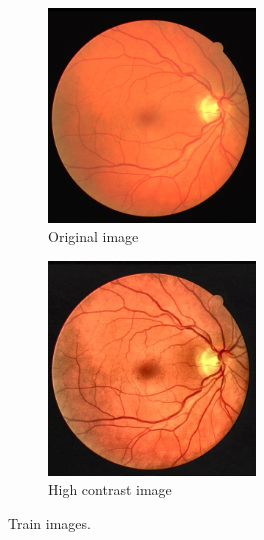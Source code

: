 \begin{frame}{\insertsectionhead}
  \begin{figure}[H]
    \begin{subfigure}{5.5cm}
      \includegraphics[width=5.5cm]{Graphics/train.jpg}
      \caption{Original image}
    \end{subfigure}
    \hspace*{1cm}
    \begin{subfigure}{5.5cm}
      \includegraphics[width=5.5cm]{Graphics/high_contrast.jpg}
      \caption{High contrast image}
    \end{subfigure}
    \caption{Train images.}
  \end{figure}
\end{frame}

